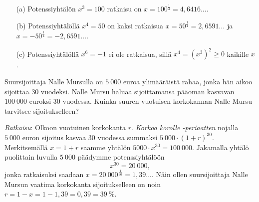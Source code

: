 \begin{esimerkki}
\begin{enumerate}
\item[(a)]
Potenssiyhtälön $x^3 = 100$ ratkaisu on $x=100^{\frac{1}{3}}=4{,}6416...$.
\item[(b)]
Potenssiyhtälöllä $x^4=50$ on kaksi ratkaisua $x=50^{\frac{1}{4}}=2{,}6591...$ ja $x=-50^{\frac{1}{4}}=-2{,}6591...$.
\item[(c)] 
Potenssiyhtälöllä $x^6 = -1$ ei ole ratkaisua, sillä $x^4 = (x^3)^2 \ge 0$ kaikille $x$.
\end{enumerate}
\end{esimerkki}



\begin{esimerkki}
Suursijoittaja Nalle Mursulla on $5\ 000$ euroa ylimääräistä rahaa, jonka hän aikoo sijoittaa $30$ vuodeksi.  Nalle Mursu haluaa sijoittamansa pääoman kasvavan $100\ 000$ euroksi $30$ vuodessa.  Kuinka suuren vuotuisen korkokannan Nalle Mursu tarvitsee sijoitukselleen?

\emph{Ratkaisu}:  Olkoon vuotuinen korkokanta $r$. \emph{Korkoa korolle -periaatten} nojalla $5\ 000$ euron sijoitus kasvaa $30$ vuodessa summaksi $5\ 000\cdot(1+r)^{30}$.  Merkitsemällä $x=1+r$ saamme yhtälön $5 000\cdot x^{30} = 100\ 000$.  Jakamalla yhtälö puolittain luvulla $5\ 000$ päädymme
potenssiyhtälöön 
$$
x^{30} = 20\ 000,
$$ 
jonka ratkaisuksi saadaan $x=20\ 000^{\frac{1}{30}} = 1{,}39...$. Näin
ollen suursijoittaja Nalle Mursun vaatima korkokanta sijoitukselleen on noin $r=1-x=1-1,39=0,39=39~\%$.
\end{esimerkki}






